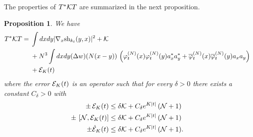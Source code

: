 \documentclass[11pt,a4paper]{article}
\newtheorem{proposition}[thm]{Proposition}
\newcommand{\done}{}
\newcommand{\ech}[2]{#2}	%
\newcommand{\ekt}{e^{K\lvert t\rvert}}	%
\newcommand{\cE}{{\cal E}}
\newcommand{\cK}{{\cal K}}
\newcommand{\cN}{{\cal N}}
\begin{document}
The properties of $T^* \cK T$ are summarized in the next proposition. 
\begin{proposition}\label{prop:TKT}
We have
\begin{equation}\label{eq:pr-K}
\begin{split}
T^* \cK T = \; &  \int dx dy | \nabla_x \text{sh}_{k_t} (y,x) |^2 + \cK  \\
&+ N^3 \int dx dy (\Delta w) (N (x-y)) \, \left(\varphi_t^{(N)} (x) \varphi_t^{(N)} (y)  a_x^* a^*_y + \overline{\varphi}_t^{(N)} (x) \overline{\varphi}_t^{(N)} (y)  a_x a_y  \right) \\
&+ \cE_K (t) 
\end{split} \end{equation}
where the error $\cE_K (t)$ is an operator such that\done{} for every $\delta > 0$ there exists a constant $C_\delta > 0$ with 
\begin{equation}\label{eq:TKT-cl} 
\begin{split} 
\pm \, \cE_K (t) &\leq \delta \cK + C_\delta \ech{\| \varphi_t^{(N)} \|_{H^2}}{\ekt} \, (\cN + 1) \\
\pm \, \left[ \cN , \cE_K (t) \right] &\leq \delta \cK + C_\delta \ech{\, \| \varphi_t^{(N)} \|_{H^2}}{\ekt} \, (\cN + 1) \\
\pm \dot{\cE}_K (t) &\leq \delta \cK + C_\delta \ech{\| \varphi_t^{(N)} \|^2_{H^3}}{\ekt} \,  (\cN+1). 
\end{split}
\end{equation}
\end{proposition}
\end{document}
